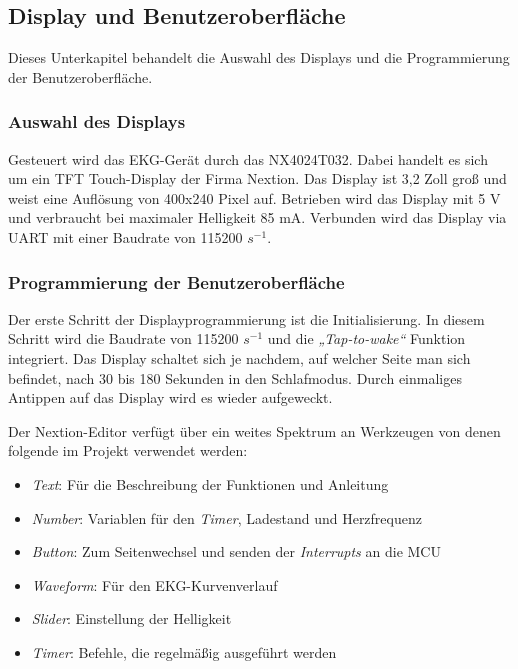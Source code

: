 
\subsection{Display und Benutzeroberfläche}

Dieses Unterkapitel behandelt die Auswahl des Displays und die Programmierung der Benutzeroberfläche.

\subsubsection{Auswahl des Displays}
Gesteuert wird das EKG-Gerät durch das NX4024T032. Dabei handelt es sich um ein TFT Touch-Display der Firma Nextion. Das Display ist 3,2 Zoll groß und weist eine Auflösung von 400x240 Pixel auf. Betrieben wird das Display mit 5 V und verbraucht bei maximaler Helligkeit 85 mA. Verbunden wird das Display via UART mit einer Baudrate von 115200 $s^{-1}$. \cite{Datenblatt_Nextion}

\subsubsection{Programmierung der Benutzeroberfläche}
Der erste Schritt der Displayprogrammierung ist die Initialisierung. In diesem Schritt wird die Baudrate von 115200 $s^{-1}$ und die \textit{„Tap-to-wake“} Funktion integriert. Das Display schaltet sich je nachdem, auf welcher Seite man sich befindet, nach 30 bis 180 Sekunden in den Schlafmodus. Durch einmaliges Antippen auf das Display wird es wieder aufgeweckt. \cite{Nextion_Anweisungen}

Der Nextion-Editor verfügt über ein weites Spektrum an Werkzeugen von denen folgende im Projekt verwendet werden:
\begin{itemize}
    \item \textit{Text}: Für die Beschreibung der Funktionen und Anleitung
    \item \textit{Number}: Variablen für den \textit{Timer}, Ladestand und Herzfrequenz
    \item \textit{Button}: Zum Seitenwechsel und senden der \textit{Interrupts} an die MCU
    \item \textit{Waveform}: Für den EKG-Kurvenverlauf
    \item \textit{Slider}: Einstellung der Helligkeit
    \item \textit{Timer}: Befehle, die regelmäßig ausgeführt werden
\end{itemize}

